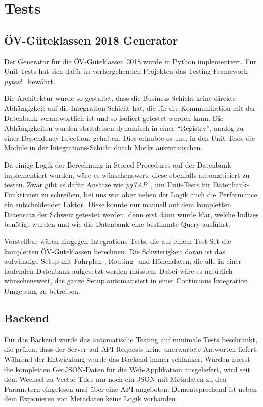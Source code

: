 \section{Tests}
\label{Tests}

\subsection{ÖV-Güteklassen 2018 Generator}
\label{Tests:ÖV-Güteklassen 2018 Generator}

Der Generator für die \acs{ÖV}-Güteklassen 2018 wurde in Python implementiert.
Für Unit-Tests hat sich dafür in vorhergehenden Projekten das Testing-Framework \emph{pytest}~\cite{pytest} bewährt.

Die Architektur wurde so gestaltet, dass die Business-Schicht keine direkte Abhängigkeit auf die Integration-Schicht hat, die für die Kommunikation mit der Datenbank verantwortlich ist und so isoliert getestet werden kann.
Die Abhängigkeiten wurden stattdessen dynamisch in einer "`Registry"', analog zu einer Dependency Injection, gehalten.
Dies erlaubte es uns, in den Unit-Tests die Module in der Integrations-Schicht durch Mocks auszutauschen.

Da einige Logik der Berechnung in Stored Procedures auf der Datenbank implementiert wurden, wäre es wünschenswert, diese ebenfalls automatisiert zu testen.
Zwar gibt es dafür Ansätze wie \emph{pgTAP}~\cite{pgTAP}, um Unit-Tests für Datenbank-Funktionen zu schreiben, bei uns war aber neben der Logik auch die Performance ein entscheidender Faktor.
Diese konnte nur manuell auf dem kompletten Datensatz der Schweiz getestet werden, denn erst dann wurde klar, welche Indizes benötigt wurden und wie die Datenbank eine bestimmte Query ausführt.

Vorstellbar wären hingegen Integrations-Tests, die auf einem Test-Set die kompletten \acs{ÖV}-Güteklassen berechnen.
Die Schwierigkeit daran ist das aufwändige Setup mit Fahrplan-, Routing- und Höhendaten, die alle in einer laufenden Datenbank aufgesetzt werden müssten.
Dabei wäre es natürlich wünschenswert, das ganze Setup automatisiert in einer Continuous Integration Umgebung zu betreiben.

\subsection{Backend}
\label{Tests:Backend}

Für das Backend wurde das automatische Testing auf minimale Tests beschränkt, die prüfen, dass der Server auf API-Requests keine unerwartete Antworten liefert.
Während der Entwicklung wurde das Backend immer schlanker.
Wurden zuerst die kompletten GeoJSON-Daten für die Web-Applikation ausgeliefert, wird seit dem Wechsel zu Vector Tiles nur noch ein JSON mit Metadaten zu den Parametern eingelesen und über eine API angeboten.
Dementsprechend ist neben dem Exponieren von Metadaten keine Logik vorhanden.

